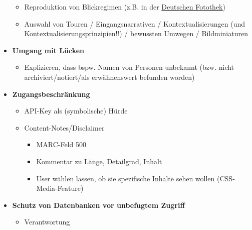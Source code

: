 \documentclass[
  letterpaper,
  DIV=11,
  numbers=noendperiod]{scrartcl}
\providecommand{\tightlist}{%
  \setlength{\itemsep}{0pt}\setlength{\parskip}{0pt}}\usepackage{longtable,booktabs,array}
\begin{document}
\begin{itemize}
  \begin{itemize}
  \tightlist
  \item
    Reproduktion von Blickregimen (z.B. in der
    \href{https://www.deutschefotothek.de/cms/weltsichten.xml}{Deutschen
    Fotothek})
  \item
    Auswahl von Touren / Eingangsnarrativen / Kontextualisierungen (und
    Kontextualisierungsprinzipien!!) / bewussten Umwegen /
    Bildminiaturen
  \end{itemize}
\item
  \textbf{Umgang mit Lücken}

  \begin{itemize}
  \tightlist
  \item
    Explizieren, dass bspw. Namen von Personen unbekannt (bzw. nicht
    archiviert/notiert/als erwähnenswert befunden worden)
  \end{itemize}
\item
  \textbf{Zugangsbeschränkung}

  \begin{itemize}
  \tightlist
  \item
    API-Key als (symbolische) Hürde
  \item
    Content-Notes/Disclaimer

    \begin{itemize}
    \tightlist
    \item
      MARC-Feld 500
    \item
      Kommentar zu Länge, Detailgrad, Inhalt
    \item
      User wählen lassen, ob sie spezifische Inhalte sehen wollen
      (CSS-Media-Feature)
    \end{itemize}
  \end{itemize}
\item
  \textbf{Schutz von Datenbanken vor unbefugtem Zugriff}

  \begin{itemize}
  \tightlist
  \item
    Verantwortung
  \end{itemize}
\end{itemize}
\end{document}
